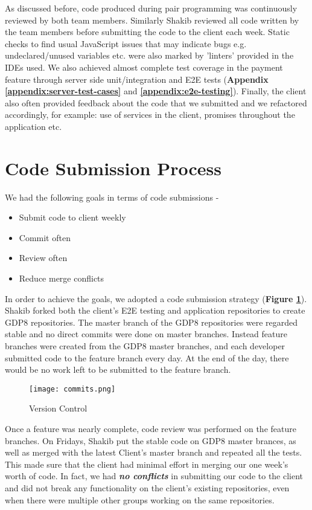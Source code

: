 As discussed before, code produced during pair programming was continuously reviewed by both team members. Similarly Shakib reviewed all code written by the team members before submitting the code to the client each week. Static checks to find usual JavaScript issues that may indicate bugs e.g. undeclared/unused variables etc. were also marked by 'linters' provided in the IDEs used. We also achieved almost complete test coverage in the payment feature through server side unit/integration and E2E tests (\textbf{Appendix \ref{appendix:server-test-cases}} and \textbf{\ref{appendix:e2e-testing}}). Finally, the client also often provided feedback about the code that we submitted and we refactored accordingly, for example: use of services in the client, promises throughout the application etc.

\section{Code Submission Process}
\label{sec:code-submission-process}

We had the following goals in terms of code submissions -

\begin{itemize}

  \item Submit code to client weekly
  \item Commit often
  \item Review often
  \item Reduce merge conflicts

\end{itemize}

In order to achieve the goals, we adopted a code submission strategy (\textbf{Figure \ref{fig:version-control}}). Shakib forked both the client's E2E testing and application repositories to create GDP8 repositories. The master branch of the GDP8 repositories were regarded stable and no direct commits were done on master branches. Instead feature branches were created from the GDP8 master branches, and each developer submitted code to the feature branch every day. At the end of the day, there would be no work left to be submitted to the feature branch.\\

\begin{figure}[!hbt]
  	\centering
 	\texttt{[image: commits.png]}
  	\caption{Version Control}
 	\label{fig:version-control}
\end{figure}

Once a feature was nearly complete, code review was performed on the feature branches. On Fridays, Shakib put the stable code on GDP8 master brances, as well as merged with the latest Client's master branch and repeated all the tests. This made sure that the client had minimal effort in merging our one week's worth of code. In fact, we had \textbf{\textit{no conflicts}} in submitting our code to the client and did not break any functionality on the client's existing repositories, even when there were multiple other groups working on the same repositories.
